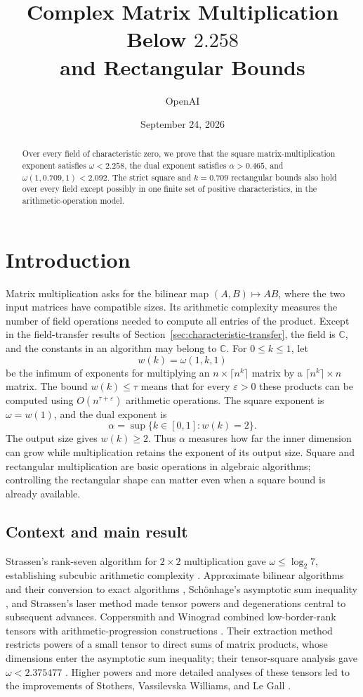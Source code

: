 \documentclass[11pt]{article}
\title{Complex Matrix Multiplication Below \(2.258\)\\and Rectangular Bounds}
\author{OpenAI}
\date{September 24, 2026}
\numberwithin{equation}{section}
\theoremstyle{definition}
\theoremstyle{remark}
\begin{document}
\begin{abstract}
Over every field of characteristic zero, we prove that the square
matrix-multiplication exponent satisfies \(\omega<2.258\), the dual exponent
satisfies \(\alpha>0.465\), and \(\omega(1,0.709,1)<2.092\). The strict
square and \(k=0.709\) rectangular bounds also hold over every field except
possibly in one finite set of positive characteristics, in the
arithmetic-operation model.
\end{abstract}
\tableofcontents
\section{Introduction}\label{sec:introduction}

Matrix multiplication asks for the bilinear map \((A,B)\mapsto AB\),
where the two input matrices have compatible sizes.  Its arithmetic
complexity measures the number of field operations needed to compute
all entries of the product.  Except in the field-transfer results
of Section~\ref{sec:characteristic-transfer}, the field is \(\mathbb C\), and
the constants in an algorithm may belong to \(\mathbb C\).
For \(0\le k\le1\), let
\[
 w(k)=\omega(1,k,1)
\]
be the infimum of exponents for multiplying an
\(n\times\lceil n^k\rceil\) matrix by a
\(\lceil n^k\rceil\times n\) matrix.
The bound \(w(k)\le\tau\) means that for every \(\varepsilon>0\)
these products can be computed using \(O(n^{\tau+\varepsilon})\)
arithmetic operations.
The square exponent is \(\omega=w(1)\), and the dual exponent is
\[
 \alpha=\sup\{k\in[0,1]:w(k)=2\}.
\]
The output size gives \(w(k)\ge2\).  Thus \(\alpha\) measures how far
the inner dimension can grow while multiplication retains the exponent
of its output size.  Square and rectangular multiplication are basic
operations in algebraic algorithms; controlling the rectangular shape
can matter even when a square bound is already available.

\subsection{Context and main result}

Strassen's rank-seven algorithm for \(2\times2\) multiplication gave
\(\omega\le\log_2 7\), establishing subcubic arithmetic complexity
\cite{strassen}.  Approximate bilinear algorithms and their conversion
to exact algorithms \cite{bini}, Sch\"onhage's asymptotic sum inequality
\cite{schonhage}, and Strassen's laser method \cite{strassen-laser}
made tensor powers and degenerations central to subsequent advances.
Coppersmith and Winograd combined low-border-rank tensors with
arithmetic-progression constructions \cite{cw}.  Their extraction
method restricts powers of a small tensor to direct sums of matrix
products, whose dimensions enter the asymptotic sum inequality;
their tensor-square analysis gave \(\omega<2.375477\)
\cite[Section~8]{cw}.
Higher powers and more detailed analyses of these tensors
led to the improvements of Stothers, Vassilevska Williams, and Le Gall
\cite{stothers,williams-powers,legall-powers}.
\end{document}
